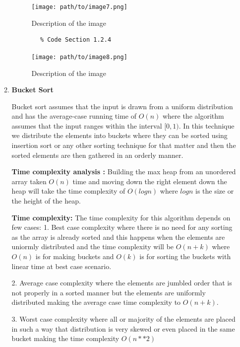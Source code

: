 \documentclass{article}
\begin{document}
\begin{enumerate}
\begin{enumerate}[label*=\arabic*.]
        \begin{figure}[h]
            \centering
            \texttt{[image: path/to/image7.png]}
            \caption{Description of the image}
            \label{fig:image7}
        \end{figure}

        \begin{verbatim}
        % Code Section 1.2.4
        \end{verbatim}

        \begin{figure}[h]
            \centering
            \texttt{[image: path/to/image8.png]}
            \caption{Description of the image}
            \label{fig:image8}
        \end{figure}



      \item \textbf{Bucket Sort}

        Bucket sort assumes that the input is drawn from a uniform distribution and has the average-case running time of \( O(n) \) where the algorithm assumes that the input ranges within the interval \( [0, 1) \). In this technique we distribute the elements into buckets where they can be sorted using insertion sort or any other sorting technique for that matter and then the sorted elements are then gathered in an orderly manner.

          \textbf{Time complexity analysis : } Building the max heap from an unordered array taken \( O(n) \) time and moving down the right element down the heap will take the time complexity of \( O(log n) \) where \( logn \) is the size or the height of the heap. 

        \textbf{ Time complexity:} The time complexity for this algorithm depends on few cases:
        1. Best case complexity where there is no need for any sorting as the array is already sorted and this happens when the elements are uniormly distributed and the time complexity will be \( O(n+k) \) where \( O(n) \) is for making buckets and \( O(k) \) is for sorting the buckets with linear time at best case scenario. 

        2. Average case complexity where the elements are jumbled order that is not properly in a sorted manner but the elements are uniformly distributed making the average case time complexity to \( O(n+k) \). 

        3. Worst case complexity where all or majority of the elements are placed in such a way that distribution is very skewed or even placed in the same bucket making the time complexity \( O(n**2) \)


\end{enumerate}
\end{enumerate}
\end{document}
